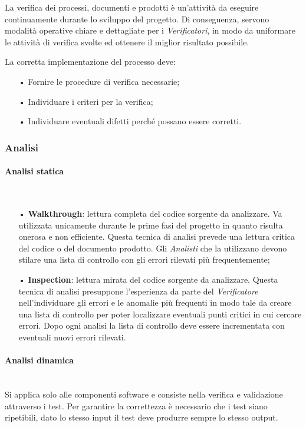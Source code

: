 {La verifica dei processi, documenti e prodotti è un'attività da eseguire continuamente durante lo sviluppo del progetto. Di conseguenza, servono modalità operative chiare e dettagliate per i \textit{Verificatori}, in modo da uniformare le attività di verifica svolte ed ottenere il miglior risultato possibile. 

La corretta implementazione del processo deve:
\begin{itemize}
\item[•] Fornire le procedure di verifica necessarie; 
\item[•] Individuare i criteri per la verifica; 
\item[•] Individuare eventuali difetti perché possano essere corretti.
\end{itemize}

\subsubsection{Analisi}


\paragraph{Analisi statica}\mbox{}\\
\begin{itemize}
\item[•] \textbf{Walkthrough}: lettura completa del codice sorgente da analizzare. Va utilizzata unicamente durante le prime fasi del progetto in quanto risulta onerosa e non efficiente. Questa tecnica di analisi prevede una lettura critica del codice o del documento prodotto. Gli \textit{Analisti} che la utilizzano devono stilare una lista di controllo con gli errori rilevati più frequentemente;
\item[•] \textbf{Inspection}: lettura mirata del codice sorgente da analizzare. Questa tecnica di analisi presuppone l’esperienza da parte del \textit{Verificatore} nell’individuare gli errori e le anomalie più frequenti in modo tale da creare una lista di controllo per poter localizzare eventuali punti critici in cui cercare errori. Dopo ogni analisi la lista di controllo deve essere incrementata con eventuali nuovi errori rilevati.
\end{itemize}

\paragraph{Analisi dinamica}\mbox{}\\
Si applica solo alle componenti software e consiste nella verifica e validazione attraverso i test. Per garantire la correttezza è necessario che i test siano ripetibili, dato lo stesso input il test deve produrre sempre lo stesso output.  

}
